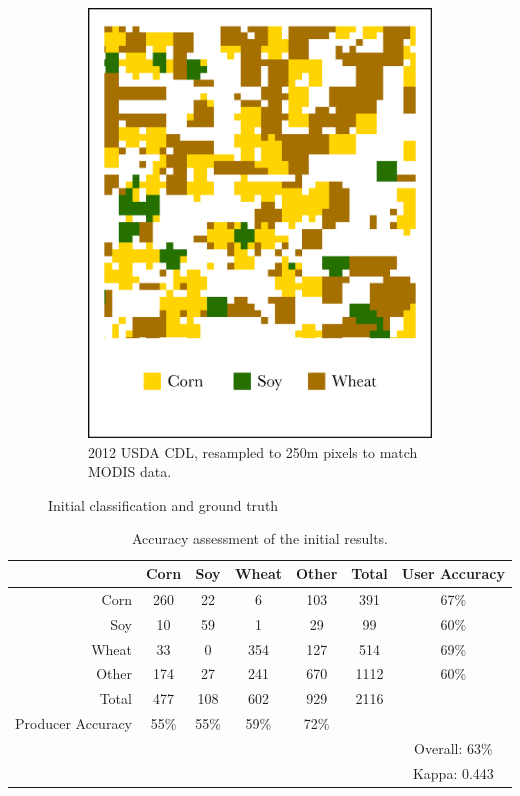 \begin{figure}
\begin{subfigure}[b]{.45\textwidth}
    \includegraphics[width=\textwidth]{Graphics/cdl_rsmp_edited.png}
    \caption{2012 USDA CDL, resampled to 250m pixels to match MODIS data.}
    \label{subfig:CDL}
  \end{subfigure}
  \caption{Initial classification and ground truth}
  \label{fig:classification}
\end{figure}


\begin{table}
  \centering
  \caption{Accuracy assessment of the initial results.}
  \label{table:acc}
  \begin{tabular}{rcccccc}
    \toprule
     & Corn & Soy & Wheat & Other & Total & User Accuracy \\
    \midrule
    Corn & 260 & 22 & 6 & 103 & 391 & 67\% \\
    Soy & 10 & 59 & 1 & 29 & 99 & 60\% \\
    Wheat & 33 & 0 & 354 & 127 & 514 & 69\% \\
    Other & 174 & 27 & 241 & 670 & 1112 & 60\% \\
    Total & 477 & 108 & 602 & 929 & 2116 \\
    Producer Accuracy & 55\% & 55\% & 59\% & 72\% \\
     &  &  &  &  &  & Overall: 63\%\\
     &  &  &  &  &  & Kappa: 0.443 \\      
    \bottomrule
  \end{tabular}
\end{table}


